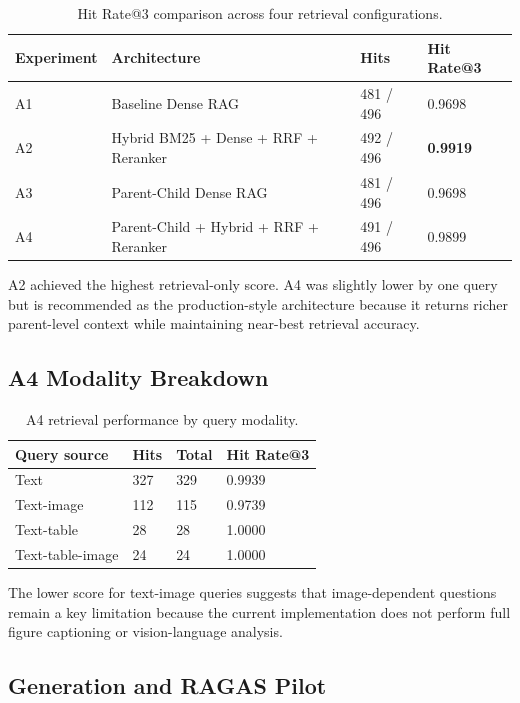 \documentclass[11pt]{article}
\begin{document}
\begin{table}[H]
\centering
\small
\begin{tabular}{llll}
\toprule
Experiment & Architecture & Hits & Hit Rate@3 \\
\midrule
A1 & Baseline Dense RAG & 481 / 496 & 0.9698 \\
A2 & Hybrid BM25 + Dense + RRF + Reranker & 492 / 496 & \textbf{0.9919} \\
A3 & Parent-Child Dense RAG & 481 / 496 & 0.9698 \\
A4 & Parent-Child + Hybrid + RRF + Reranker & 491 / 496 & 0.9899 \\
\bottomrule
\end{tabular}
\caption{Hit Rate@3 comparison across four retrieval configurations.}
\end{table}

A2 achieved the highest retrieval-only score. A4 was slightly lower by one query but is recommended as the production-style architecture because it returns richer parent-level context while maintaining near-best retrieval accuracy.

\subsection{A4 Modality Breakdown}

\begin{table}[H]
\centering
\small
\begin{tabular}{llll}
\toprule
Query source & Hits & Total & Hit Rate@3 \\
\midrule
Text & 327 & 329 & 0.9939 \\
Text-image & 112 & 115 & 0.9739 \\
Text-table & 28 & 28 & 1.0000 \\
Text-table-image & 24 & 24 & 1.0000 \\
\bottomrule
\end{tabular}
\caption{A4 retrieval performance by query modality.}
\end{table}

The lower score for text-image queries suggests that image-dependent questions remain a key limitation because the current implementation does not perform full figure captioning or vision-language analysis.

\subsection{Generation and RAGAS Pilot}
\end{document}
